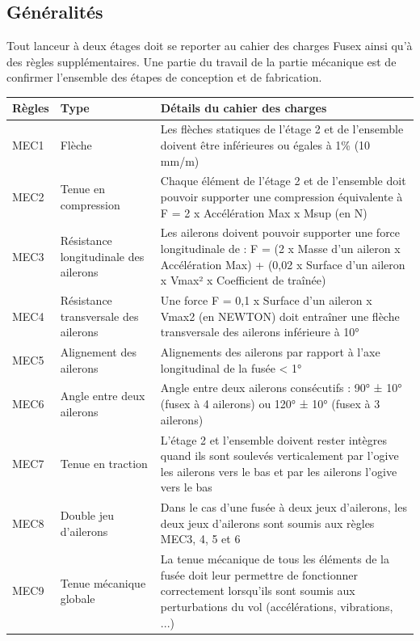 \subsection{Généralités}
\label{subsec:generalites}

Tout lanceur à deux étages doit se reporter au cahier des charges Fusex ainsi qu'à des règles supplémentaires. 
Une partie du travail de la partie mécanique est de confirmer l'ensemble des étapes de conception et de fabrication.

\begin{table}[h!]
\centering
\begin{tabular}{|p{1.2cm}|p{4cm}|p{10cm}|}
\hline
Règles & Type & Détails du cahier des charges \\ \hline

MEC1  & Flèche & Les flèches statiques de l’étage 2 et de l’ensemble doivent être inférieures ou égales à 1\% (10 mm/m) \\ \hline
MEC2  & Tenue en compression & Chaque élément de l’étage 2 et de l’ensemble doit pouvoir supporter une compression équivalente à F = 2 x Accélération Max x Msup (en N) \\ \hline
MEC3  & Résistance longitudinale des ailerons & Les ailerons doivent pouvoir supporter une force longitudinale de : F = (2 x Masse d’un aileron x Accélération Max) + (0,02 x Surface d’un aileron x Vmax² x Coefficient de traînée) \\ \hline
MEC4  & Résistance transversale des ailerons & Une force F = 0,1 x Surface d’un aileron x Vmax2 (en NEWTON) doit entraîner une flèche transversale des ailerons inférieure à 10° \\ \hline
MEC5  & Alignement des ailerons & Alignements des ailerons par rapport à l’axe longitudinal de la fusée < 1° \\ \hline
MEC6  & Angle entre deux ailerons & Angle entre deux ailerons consécutifs : 90° ± 10° (fusex à 4 ailerons) ou 120° ± 10° (fusex à 3 ailerons) \\ \hline
MEC7  & Tenue en traction & L’étage 2 et l’ensemble doivent rester intègres quand ils sont soulevés verticalement par l'ogive les ailerons vers le bas et par les ailerons l'ogive vers le bas \\ \hline
MEC8  & Double jeu d'ailerons & Dans le cas d’une fusée à deux jeux d’ailerons, les deux jeux d’ailerons sont soumis aux règles MEC3, 4, 5 et 6 \\ \hline
MEC9  & Tenue mécanique globale & La tenue mécanique de tous les éléments de la fusée doit leur permettre de fonctionner correctement lorsqu’ils sont soumis aux perturbations du vol (accélérations, vibrations, ...) \\ \hline

\end{tabular}
\end{table}

